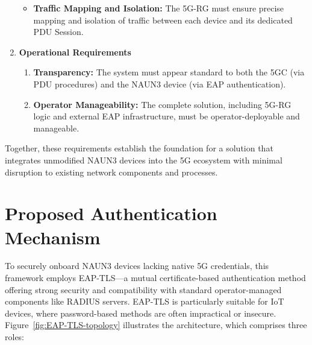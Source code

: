 \begin{enumerate}
{\begin{itemize}
{                \textbf{Lifecycle Management:} The \ac{5G-RG} must manage each device's session from initial authentication to disconnection, including re-authentication and \ac{PDU} Session teardown.
            }
            \item {
                \textbf{Traffic Mapping and Isolation:} The \ac{5G-RG} must ensure precise mapping and isolation of traffic between each device and its dedicated \ac{PDU} Session.
            }
        \end{itemize}
    }
    \item {
        \textbf{Operational Requirements}
        \begin{enumerate}
            \item {
                \textbf{Transparency:} The system must appear standard to both the \ac{5GC} (via \ac{PDU} procedures) and the \ac{NAUN3} device (via \ac{EAP} authentication).
            }
            \item {
                \textbf{Operator Manageability:} The complete solution, including \ac{5G-RG} logic and external \ac{EAP} infrastructure, must be operator-deployable and manageable.
            }
        \end{enumerate}
    }
\end{enumerate}

Together, these requirements establish the foundation for a solution that integrates unmodified \ac{NAUN3} devices into the \ac{5G} ecosystem with minimal disruption to existing network components and processes.

\section{Proposed Authentication Mechanism}

To securely onboard \ac{NAUN3} devices lacking native \ac{5G} credentials, this framework employs \ac{EAP-TLS}—a mutual certificate-based authentication method offering strong security and compatibility with standard operator-managed components like \ac{RADIUS} servers. \ac{EAP-TLS} is particularly suitable for \ac{IoT} devices, where password-based methods are often impractical or insecure. Figure~\ref{fig:EAP-TLS-topology} illustrates the architecture, which comprises three roles:

